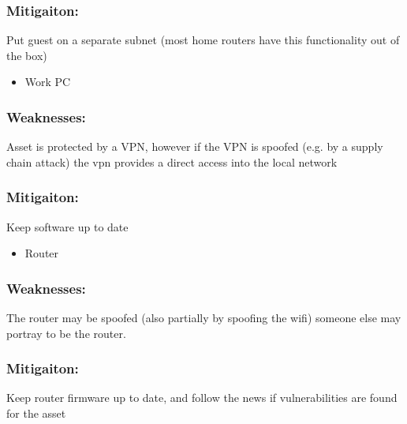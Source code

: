 \documentclass[
	letterpaper, %
	10pt, %
	unnumberedsections, %
	twoside, %
]{APAAssignment}
\begin{document}
\begin{singlespace}
\subsubsection{Mitigaiton:} Put guest on a separate subnet (most home routers have this functionality out of the box)

\begin{itemize}
	\item Work PC
\end{itemize}

\subsubsection{Weaknesses:} Asset is protected by a VPN, however if the VPN is spoofed (e.g. by a supply chain attack) the vpn provides a direct access into the local network
\subsubsection{Mitigaiton:} Keep software up to date

\begin{itemize}
	\item Router
\end{itemize}

\subsubsection{Weaknesses:} The router may be spoofed (also partially by spoofing the wifi) someone else may portray to be the router. 
\subsubsection{Mitigaiton:} Keep router firmware up to date, and follow the news if vulnerabilities are found for the asset


\end{singlespace}
\end{document}
